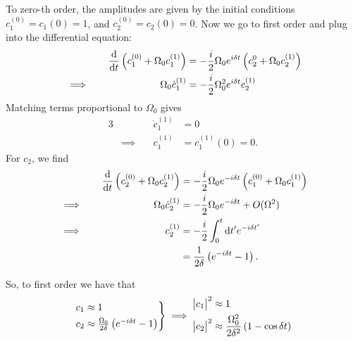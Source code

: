 \documentclass[12pt]{article}
\newcommand{\magsq}[1]{\big|#1\big|^2}
\begin{document}
To zero-th order, the amplitudes are given by the initial conditions $c_1^{(0)} = c_1(0) = 1$, and $c_2^{(0)} = c_2(0) = 0$. Now we go to first order and plug into the differential equation:
\begin{alignat*}{3}
    &\quad & \dv{t}\left(c_1^{(0)} + \Omega_0c_1^{(1)}\right) &= -\frac{i}{2}\Omega_0e^{i\delta t}\left(c_2^{0} + \Omega_0c_2^{(1)}\right) \\
    &\implies\quad & \Omega_0\dot{c}_1^{(1)} &= -\frac{i}{2}\Omega_0^2e^{i\delta t}c_2^{(1)}
\end{alignat*}
Matching terms proportional to $\Omega_0$ gives
\begin{alignat*}{3}
    &\quad & \dot{c}_1^{(1)} &= 0 \\
    &\implies\quad & c_1^{(1)} &= c_1^{(1)}(0) = 0.
\end{alignat*}
For $c_2$, we find
\begin{alignat*}{3}
    &\quad & \dv{t}\left(c_2^{(0)} + \Omega_0c_2^{(1)}\right) &= -\frac{i}{2}\Omega_0e^{-i\delta t}\left(c_1^{(0)} + \Omega_0c_1^{(1)}\right) \\
    &\implies\quad & \Omega_0\dot{c}_2^{(1)} &= -\frac{i}{2}\Omega_0e^{-i\delta t} + O(\Omega^2) \\
    &\implies\quad & c_2^{(1)} &= -\frac{i}{2}\int_0^t\dd t' e^{-i\delta t'} \\
    & & &= \frac{1}{2\delta}\left(e^{-i\delta t} - 1\right).
\end{alignat*}

So, to first order we have that
\begin{equation*}
    \begin{rcases*}
        c_1 \approx 1 \\
        c_2 \approx \frac{\Omega_0}{2\delta}\left(e^{-i\delta t} - 1\right)
    \end{rcases*}
    \implies
    \begin{aligned}
        \magsq{c_1} &\approx 1 \\
        \magsq{c_2} &\approx \frac{\Omega_0^2}{2\delta^2}\left(1 - \cos\delta t\right)
    \end{aligned}
\end{equation*}
\end{document}
